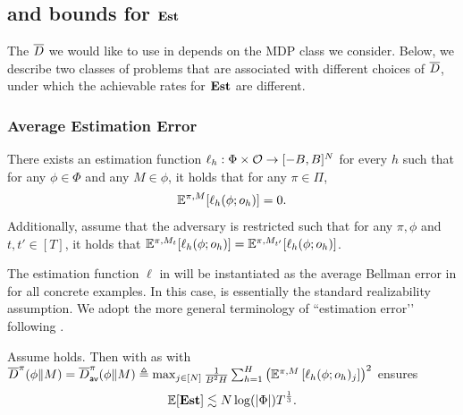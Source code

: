\subsection{\postupdate and bounds for $\textbf{\textup{Est}}$}\label{sec: postupdate sec}
The $\overline{D}$ we would like to use in  depends on the MDP class we consider. Below, we describe two classes of problems that are associated with different choices of $\overline{D}$, under which the achievable rates for $\textbf{\textup{Est}}$ are different. 

\subsubsection{Average Estimation Error}
\begin{assumption}\label{assum: avg err}
    There exists an estimation function $\ell_h: \Phi\times \mathcal{O}\to [-B,B]^{N}$ for every $h$ such that for any $\phi\in\Phi$ and any $M\in\phi$, it holds that for any $\pi\in\Pi$, 
    \begin{align*}
        \mathbb{E}^{\pi, M}[\ell_h(\phi; o_h)] = 0.    
    \end{align*}
    Additionally, assume that the adversary is restricted such that for any $\pi,\phi$ and $t,t'\in[T]$, it holds that $\mathbb{E}^{\pi, M_t}[\ell_h(\phi; o_h)]=\mathbb{E}^{\pi, M_{t'}}[\ell_h(\phi; o_h)]$.
\end{assumption}

The estimation function $\ell$ in  will be instantiated as the average Bellman error in  for all concrete examples. In this case,   is essentially the standard realizability assumption. We adopt the more general terminology of “estimation error’’ following \cite{du2021bilinear}.



\begin{theorem}
\label{thm: avg est}
    Assume  holds. Then  with  as \postupdate with $\overline{D}^\pi(\phi\|M) = \overline{D}_{\mathsf{av}}^\pi(\phi\|M) \triangleq \max_{j\in[N]}\frac{1}{B^2H}\sum_{h=1}^H  \left(\mathbb{E}^{\pi, M}\left[\ell_h(\phi; o_h)_j\right]\right)^2$ ensures 
    \begin{align*}
        \mathbb{E}[\textbf{\textup{Est}}] \lesssim N\log(|\Phi|)T^\frac{1}{3}. 
    \end{align*}
\end{theorem}


